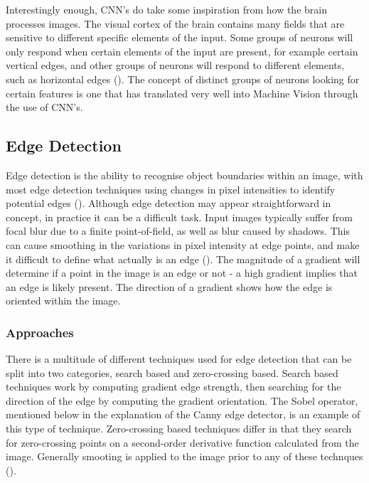 \documentclass[12pt]{report}
\begin{document}
\begin{flushleft}
Interestingly enough, CNN's do take some inspiration from how the brain processes images. The visual cortex of the brain contains many fields that are sensitive to different specific elements of the input. Some groups of neurons will only respond when certain elements of the input are present, for example certain vertical edges, and other groups of neurons will respond to different elements, such as horizontal edges (\cite{youtube}). The concept of distinct groups of neurons looking for certain features is one that has translated very well into Machine Vision through the use of CNN's.
\end{flushleft}

\subsection{Edge Detection}
\begin{flushleft}
Edge detection is the ability to recognise object boundaries within an image, with most edge detection techniques using changes in pixel intensities to identify potential edges (\cite{arbelaez2011contour}). Although edge detection may appear straightforward in concept, in practice it can be a difficult task. Input images typically suffer from focal blur due to a finite point-of-field, as well as blur caused by shadows. This can cause smoothing in the variations in pixel intensity at edge points, and make it difficult to define what actually is an edge (\cite{ziou1998edge}). The magnitude of a gradient will determine if a point in the image is an edge or not - a high gradient implies that an edge is likely present. The direction of a gradient shows how the edge is oriented within the image.
\end{flushleft}

\subsubsection{Approaches}
\begin{flushleft}
There is a multitude of different techniques used for edge detection that can be split into two categories, search based and zero-crossing based. Search based techniques work by computing gradient edge strength, then searching for the direction of the edge by computing the gradient orientation. The Sobel operator, mentioned below in the explanation of the Canny edge detector, is an example of this type of technique. Zero-crossing based techniques differ in that they search for zero-crossing points on a second-order derivative function calculated from the image. Generally smooting is applied to the image prior to any of these technques (\cite{ziou1998edge}).
\end{flushleft}
\end{document}
